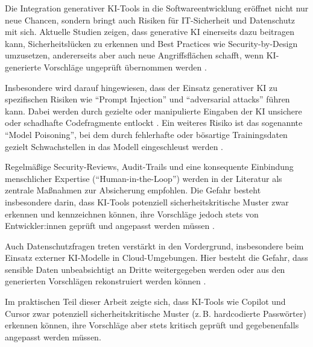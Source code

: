 
Die Integration generativer KI-Tools in die Softwareentwicklung eröffnet nicht
nur neue Chancen, sondern bringt auch Risiken für IT-Sicherheit und Datenschutz
mit sich. Aktuelle Studien zeigen, dass generative KI einerseits dazu beitragen
kann, Sicherheitslücken zu erkennen und Best Practices wie Security-by-Design
umzusetzen, andererseits aber auch neue Angriffsflächen schafft, wenn
KI-generierte Vorschläge ungeprüft übernommen werden
\cite{shi_ai-assisted_2023, alwageed_role_nodate}.

Insbesondere wird darauf hingewiesen, dass der Einsatz generativer KI zu
spezifischen Risiken wie \enquote{Prompt Injection} und \enquote{adversarial
    attacks} führen kann. Dabei werden durch gezielte oder manipulierte Eingaben
der KI unsichere oder schadhafte Codefragmente entlockt
\cite{shi_ai-assisted_2023}. Ein weiteres Risiko ist das sogenannte
\enquote{Model Poisoning}, bei dem durch fehlerhafte oder bösartige
Trainingsdaten gezielt Schwachstellen in das Modell eingeschleust werden
\cite{alwageed_role_nodate}.

Regelmäßige Security-Reviews, Audit-Trails und eine konsequente Einbindung
menschlicher Expertise (\enquote{Human-in-the-Loop}) werden in der Literatur
als zentrale Maßnahmen zur Absicherung empfohlen. Die Gefahr besteht
insbesondere darin, dass KI-Tools potenziell sicherheitskritische Muster zwar
erkennen und kennzeichnen können, ihre Vorschläge jedoch stets von
Entwickler:innen geprüft und angepasst werden müssen
\cite{shi_ai-assisted_2023, alwageed_role_nodate, siebert_generative_2024}.

Auch Datenschutzfragen treten verstärkt in den Vordergrund, insbesondere beim
Einsatz externer KI-Modelle in Cloud-Umgebungen. Hier besteht die Gefahr, dass
sensible Daten unbeabsichtigt an Dritte weitergegeben werden oder aus den
generierten Vorschlägen rekonstruiert werden können
\cite{siebert_generative_2024}.

Im praktischen Teil dieser Arbeit zeigte sich, dass KI-Tools wie Copilot und
Cursor zwar potenziell sicherheitskritische Muster (z.\,B. hardcodierte
Passwörter) erkennen können, ihre Vorschläge aber stets kritisch geprüft und
gegebenenfalls angepasst werden müssen.
